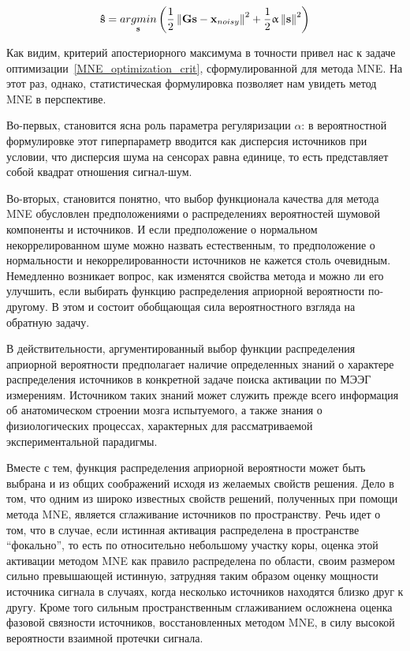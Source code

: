 \begin{equation}
    \mathbf{\hat{s}} =
    \underset{\mathbf{s}}{argmin} \left(
        \frac{1}{2}\left\lVert\mathbf{Gs - x}_{noisy}\right\rVert^2 + \frac{1}{2}\upalpha\left\lVert\mathbf{s}\right\rVert^2
    \right)
    \label{logMAP_crit_for_MNE}
\end{equation}

Как видим, критерий апостериорного максимума в точности привел нас
к задаче оптимизации~\ref{MNE_optimization_crit}, сформулированной для
метода MNE. На этот раз, однако, статистическая формулировка позволяет
нам увидеть метод MNE в перспективе.

Во-первых, становится ясна роль параметра регуляризации $\alpha$:
в вероятностной формулировке этот гиперпараметр вводится как дисперсия
источников при условии, что дисперсия шума на сенсорах равна единице,
то есть представляет собой квадрат отношения сигнал-шум.

Во-вторых, становится понятно, что выбор функционала качества для метода MNE
обусловлен предположениями о распределениях вероятностей шумовой компоненты и
источников. И если предположение о нормальном некоррелированном шуме можно
назвать естественным, то предположение о нормальности и некоррелированности
источников не кажется столь очевидным.  Немедленно возникает вопрос, как
изменятся свойства метода и можно ли его улучшить, если выбирать функцию
распределения априорной вероятности по-другому. В этом и состоит обобщающая
сила вероятностного взгляда на обратную задачу.

В действительности, аргументированный выбор функции распределения априорной
вероятности предполагает наличие определенных знаний о характере распределения
источников в конкретной задаче поиска активации по МЭЭГ измерениям. Источником
таких знаний может служить прежде всего информация об анатомическом строении
мозга испытуемого, а также знания о физиологических процессах, характерных для
рассматриваемой экспериментальной парадигмы.

Вместе с тем, функция распределения априорной вероятности может быть выбрана и из
общих соображений исходя из желаемых свойств решения. Дело в том, что одним из
широко известных свойств решений, полученных при помощи метода MNE, является
сглаживание источников по пространству. Речь идет о том, что в случае,
если истинная активация распределена в пространстве ``фокально'', то есть
по относительно небольшому участку коры, оценка этой активации методом
MNE как правило распределена по области, своим размером сильно превышающей
истинную, затрудняя таким образом оценку мощности источника сигнала в
случаях, когда несколько источников находятся близко друг к другу.
Кроме того сильным пространственным сглаживанием осложнена оценка фазовой
связности источников, восстановленных методом MNE, в силу высокой вероятности
взаимной протечки сигнала.

